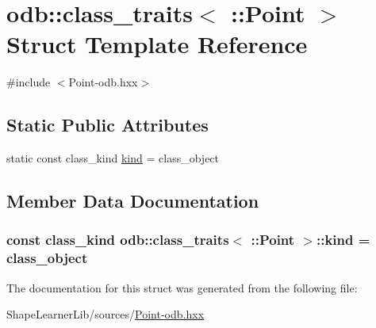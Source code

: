 \hypertarget{structodb_1_1class__traits_3_01_1_1_point_01_4}{}\section{odb\+:\+:class\+\_\+traits$<$ \+:\+:Point $>$ Struct Template Reference}
\label{structodb_1_1class__traits_3_01_1_1_point_01_4}


{\ttfamily \#include $<$Point-\/odb.\+hxx$>$}

\subsection*{Static Public Attributes}
\begin{DoxyCompactItemize}
\item 
static const class\+\_\+kind \hyperlink{structodb_1_1class__traits_3_01_1_1_point_01_4_a143ab7f30900e8705aff75c29294d749}{kind} = class\+\_\+object
\end{DoxyCompactItemize}


\subsection{Member Data Documentation}
\hypertarget{structodb_1_1class__traits_3_01_1_1_point_01_4_a143ab7f30900e8705aff75c29294d749}{}
\subsubsection[{kind}]{\setlength{\rightskip}{0pt plus 5cm}const class\+\_\+kind odb\+::class\+\_\+traits$<$ \+::{\bf Point} $>$\+::kind = class\+\_\+object\hspace{0.3cm}{\ttfamily [static]}}\label{structodb_1_1class__traits_3_01_1_1_point_01_4_a143ab7f30900e8705aff75c29294d749}


The documentation for this struct was generated from the following file\+:\begin{DoxyCompactItemize}
\item 
Shape\+Learner\+Lib/sources/\hyperlink{_point-odb_8hxx}{Point-\/odb.\+hxx}\end{DoxyCompactItemize}
